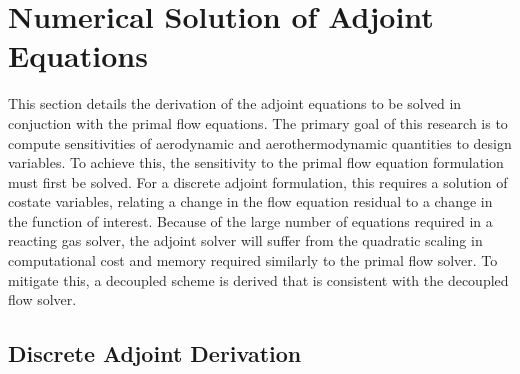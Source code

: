 \chapter{Numerical Solution of Adjoint Equations}
\label{chapter-four}

This section details the derivation of the adjoint equations to be solved in
conjuction with the primal flow equations.  The primary goal of this research is
to compute sensitivities of aerodynamic and aerothermodynamic quantities to
design variables.  To achieve this, the sensitivity to the primal flow equation
formulation must first be solved.  For a discrete adjoint formulation, this
requires a solution of costate variables, relating a change in the flow equation
residual to a change in the function of interest.  Because of the large number
of equations required in a reacting gas solver, the adjoint solver will suffer
from the quadratic scaling in computational cost and memory required similarly
to the primal flow solver.  To mitigate this, a decoupled scheme is derived that
is consistent with the decoupled flow solver.

\section{Discrete Adjoint Derivation}

